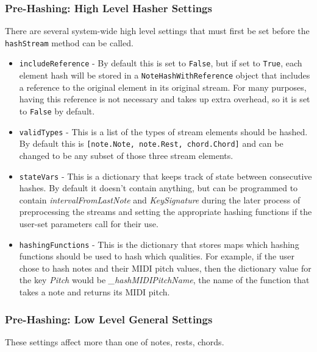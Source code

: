 \subsubsection{Pre-Hashing: High Level Hasher Settings}
There are several system-wide high level settings that must first be set before the \texttt{hashStream} method can be called.
\begin{itemize}
\item \texttt{includeReference} - By default this is set to \texttt{False}, but if set to \texttt{True}, each element hash will be stored in a \texttt{NoteHashWithReference} object that includes a reference to the original element in its original stream. For many purposes, having this reference is not necessary and takes up extra overhead, so it is set to \texttt{False} by default.

\item \texttt{validTypes} - This is a list of the types of stream elements should be hashed. By default this is \texttt{[note.Note, note.Rest, chord.Chord]} and can be changed to be any subset of those three stream elements.
\item \texttt{stateVars} - This is a dictionary that keeps track of state between consecutive hashes. By default it doesn't contain anything, but can be programmed to contain \textit{intervalFromLastNote} and \textit{KeySignature} during the later process of preprocessing the streams and setting the appropriate hashing functions if the user-set parameters call for their use. 

\item \texttt{hashingFunctions} - This is the dictionary that stores maps which hashing functions should be used to hash which qualities. For example, if the user chose to hash notes and their MIDI pitch values, then the dictionary value for the key \textit{Pitch} would be \textit{\_hashMIDIPitchName}, the name of the function that takes a note and returns its MIDI pitch. 
\end{itemize}

        \subsubsection{Pre-Hashing: Low Level General Settings}
        These settings affect more than one of notes, rests, chords.
        
